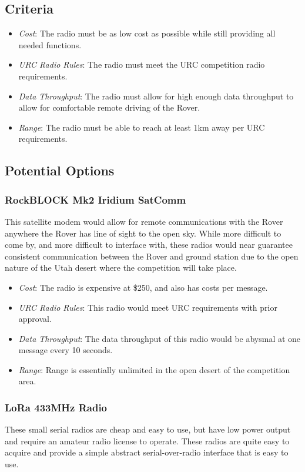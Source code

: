 \documentclass[onecolumn, draftclsnofoot, 10pt, compsoc]{IEEEtran}
\begin{document}
\subsection{Criteria}
\begin{itemize}
\item \textit{Cost}: The radio must be as low cost as possible while still providing all needed functions.
\item \textit{URC Radio Rules}: The radio must meet the URC competition radio requirements.
\item \textit{Data Throughput}: The radio must allow for high enough data throughput to allow for comfortable remote driving of the Rover.
\item \textit{Range}: The radio must be able to reach at least 1km away per URC requirements.
\end{itemize}

\subsection{Potential Options}
\subsubsection{RockBLOCK Mk2 Iridium SatComm}
This satellite modem would allow for remote communications with the Rover anywhere the Rover has line of sight to the open sky. While more difficult to come by, and more difficult to interface with, these radios would near guarantee consistent communication between the Rover and ground station due to the open nature of the Utah desert where the competition will take place.

\begin{itemize}
\item \textit{Cost}: The radio is expensive at \$250, and also has costs per message.
\item \textit{URC Radio Rules}: This radio would meet URC requirements with prior approval.
\item \textit{Data Throughput}: The data throughput of this radio would be abysmal at one message every 10 seconds. 
\item \textit{Range}: Range is essentially unlimited in the open desert of the competition area.
\end{itemize}

\subsubsection{LoRa 433MHz Radio}
These small serial radios are cheap and easy to use, but have low power output and require an amateur radio license to operate.
These radios are quite easy to acquire and provide a simple abstract serial-over-radio interface that is easy to use.
\end{document}
